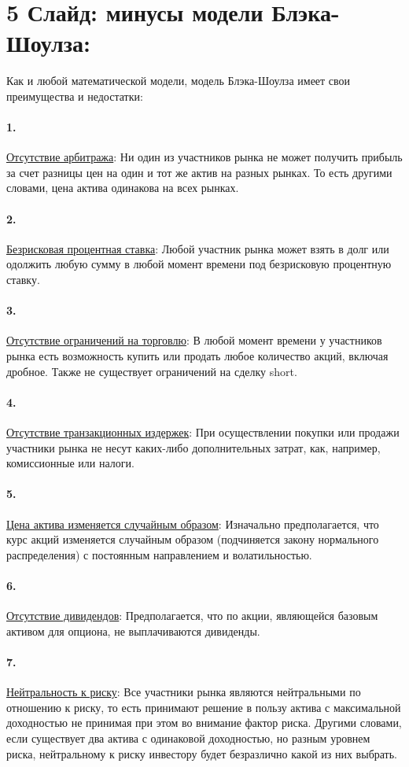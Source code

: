 \documentclass[a4paper]{article}
\begin{document}
\section*{5 Слайд: минусы модели Блэка-Шоулза:}
Как и любой математической модели, модель Блэка-Шоулза имеет свои преимущества и недостатки:
\paragraph*{1.} \underline{Отсутствие арбитража}: Ни один из участников рынка не может получить прибыль за счет разницы цен на один и тот же актив на разных рынках. То есть другими словами, цена актива одинакова на всех рынках.
\paragraph*{2.} \underline{Безрисковая процентная ставка}: Любой участник рынка может взять в долг или одолжить любую сумму в любой момент времени под безрисковую процентную ставку.
\paragraph*{3.} \underline{Отсутствие ограничений на торговлю}: В любой момент времени у участников рынка есть возможность купить или продать любое количество акций, включая дробное. Также не существует ограничений на сделку short.
\paragraph*{4.} \underline{Отсутствие транзакционных издержек}: При осуществлении покупки или продажи участники рынка не несут каких-либо дополнительных затрат, как, например, комиссионные или налоги.
\paragraph*{5.} \underline{Цена актива изменяется случайным образом}: Изначально предполагается, что курс акций изменяется случайным образом (подчиняется закону нормального распределения) с постоянным направлением и волатильностью.
\paragraph*{6.} \underline{Отсутствие дивидендов}: Предполагается, что по акции, являющейся базовым активом для опциона, не выплачиваются дивиденды.

\paragraph*{7.} \underline{Нейтральность к риску}: Все участники рынка являются нейтральными по отношению к риску, то есть принимают решение в пользу актива с максимальной доходностью не принимая при этом во внимание фактор риска. Другими словами, если существует два актива с одинаковой доходностью, но разным уровнем риска, нейтральному к риску инвестору будет безразлично какой из них выбрать.
\end{document}
